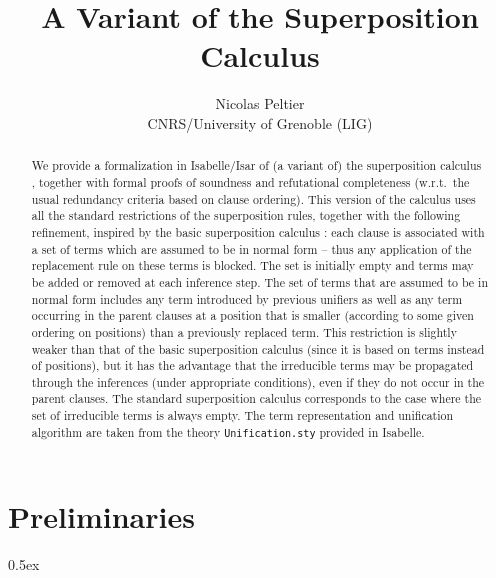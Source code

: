 \documentclass[11pt,a4paper]{article}
\begin{document}
\title{A Variant of the Superposition Calculus}
\author{Nicolas Peltier\\ CNRS/University of Grenoble (LIG)}
\maketitle

\begin{abstract}
We provide a formalization in Isabelle/Isar of (a variant of) the superposition calculus \cite{BG94,DBLP:books/el/RV01/NieuwenhuisR01}, together with formal proofs of soundness and refutational completeness (w.r.t.\ the usual redundancy criteria based on clause ordering).
This version of the calculus uses all the standard restrictions of the superposition rules, together with the following refinement, inspired by the basic superposition calculus \cite{DBLP:conf/cade/BachmairGLS92,DBLP:journals/iandc/BachmairGLS95}:
each clause is associated with a set of terms which are assumed to be in normal form -- thus any application
of the replacement rule on these terms is blocked.
The set is initially empty and terms may be added or removed at each inference step.
The set of terms that are assumed to be in normal form includes 
any term introduced by previous unifiers as well as any term occurring in the parent clauses at a position that is smaller (according to some given ordering on positions) than a previously replaced term. This
restriction is slightly weaker than that of the basic superposition calculus (since it is based on terms instead of positions), but
 it has the advantage that the irreducible terms may be propagated through the inferences (under appropriate conditions), even if they do not occur in the parent clauses. The standard superposition calculus corresponds to the case where the set of irreducible terms is always empty.
The term representation and unification algorithm are taken from the theory {\tt Unification.sty} provided in Isabelle.
\end{abstract}

\tableofcontents

\newpage

\section{Preliminaries}

\parindent 0pt\parskip 0.5ex



%
%



\end{document}
